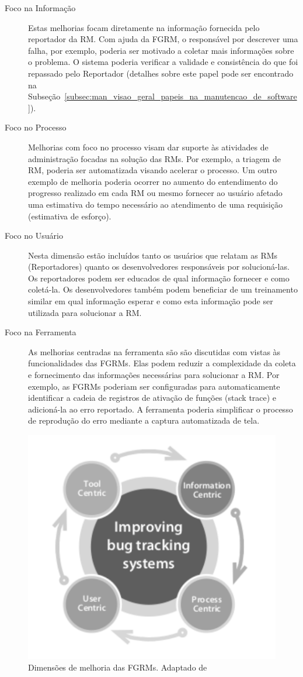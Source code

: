 \begin{description}
	\item[Foco na Informação] Estas melhorias focam diretamente na informação
		fornecida pelo reportador da RM\@. Com ajuda da FGRM, o responsável por
		descrever uma falha, por exemplo, poderia ser motivado a coletar mais
		informações sobre o problema. O sistema poderia verificar a validade e
		consistência do que foi repassado pelo Reportador (detalhes sobre este
		papel pode ser encontrado na
		Subseção~\ref{subsec:man_visao_geral_papeis_na_manutencao_de_software}).
	\item[Foco no Processo] Melhorias com foco no processo visam dar suporte às
		atividades de administração focadas na solução das RMs. Por exemplo, a
		triagem de RM, poderia ser automatizada visando acelerar o processo. Um
		outro exemplo de melhoria poderia ocorrer no aumento do entendimento do
		progresso realizado em cada RM ou mesmo fornecer ao usuário afetado uma
		estimativa do tempo necessário ao atendimento de uma requisição
		(estimativa de esforço).
	\item[Foco no Usuário] Nesta dimensão estão incluídos tanto os usuários que
		relatam as RMs (Reportadores) quanto os desenvolvedores responsáveis por
		solucioná-las.  Os reportadores podem ser educados de qual informação
		fornecer e como coletá-la. Os desenvolvedores também podem beneficiar de
		um treinamento similar em qual informação esperar e como esta informação
		pode ser utilizada para solucionar a RM\@.
	\item[Foco na Ferramenta] As melhorias centradas na ferramenta são são
		discutidas com vistas às funcionalidades das FGRMs\@. Elas podem reduzir
		a complexidade da coleta e fornecimento das informações necessárias para
		solucionar a RM\@. Por exemplo, as FGRMs poderiam ser configuradas para
		automaticamente identificar a cadeia de registros de ativação de funções
		(stack trace) e adicioná-la ao erro reportado. A ferramenta poderia
		simplificar o processo de reprodução do erro mediante a captura
		automatizada de tela.
\end{description}

\begin{figure}[htpb] \centering
	\includegraphics[width=0.5\linewidth]
	{chapter-intro/img/dimensoes_melhorias_fgrm.pdf}
	\caption{Dimensões de melhoria das FGRMs. Adaptado
		de~\cite{zimmermann2005mining}}\label{fig:dimensoes_melhorias_fgrm}
\end{figure}


